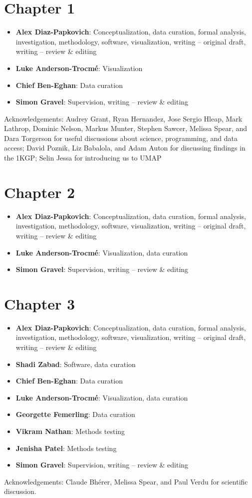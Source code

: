 \section*{Chapter 1}
\begin{itemize}
\item \textbf{Alex Diaz-Papkovich}: Conceptualization, data curation, formal analysis, investigation, methodology, software, visualization, writing -- original draft, writing -- review \& editing 
\item \textbf{Luke Anderson-Trocm\'{e}}: Visualization
\item \textbf{Chief Ben-Eghan}: Data curation
\item \textbf{Simon Gravel}: Supervision, writing -- review \& editing
\end{itemize}

Acknowledgements: Audrey Grant, Ryan Hernandez, Jose Sergio Hleap, Mark Lathrop, Dominic Nelson, Markus Munter, Stephen Sawcer, Melissa Spear, and Dara Torgerson for useful discussions about science, programming, and data access; David Poznik, Liz Babalola, and Adam Auton for discussing findings in the 1KGP; Selin Jessa for introducing us to UMAP

\section*{Chapter 2}

\begin{itemize}
\item \textbf{Alex Diaz-Papkovich}: Conceptualization, data curation, formal analysis, investigation, methodology, software, visualization, writing -- original draft, writing -- review \& editing
\item \textbf{Luke Anderson-Trocm\'{e}}: Visualization, data curation
\item \textbf{Simon Gravel}: Supervision, writing -- review \& editing
\end{itemize}

\section*{Chapter 3}
\begin{itemize}
\item \textbf{Alex Diaz-Papkovich}: Conceptualization, data curation, formal analysis, investigation, methodology, software, visualization, writing -- original draft, writing -- review \& editing
\item \textbf{Shadi Zabad}: Software, data curation
\item \textbf{Chief Ben-Eghan}: Data curation
\item \textbf{Luke Anderson-Trocm\'{e}}: Visualization, data curation
\item \textbf{Georgette Femerling}: Data curation
\item \textbf{Vikram Nathan}: Methods testing
\item \textbf{Jenisha Patel}: Methods testing
\item \textbf{Simon Gravel}: Supervision, writing -- review \& editing
\end{itemize}

Acknowledgements: Claude Bh\'{e}rer, Melissa Spear, and Paul Verdu for scientific discussion.
